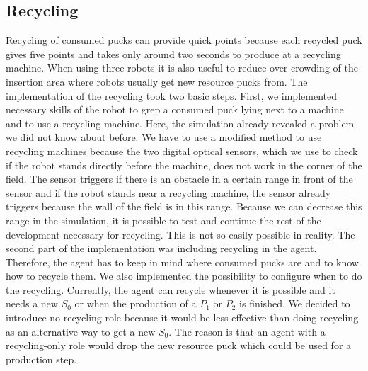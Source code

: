 \subsection{Recycling}
Recycling of consumed pucks can provide quick points because each recycled puck gives five points and takes only around two seconds to produce at a recycling machine. When using three robots it is also useful to reduce over-crowding of the insertion area where robots usually get new resource pucks from. The implementation of the recycling took two basic steps. First, we implemented necessary skills of the robot to grep a consumed puck lying next to a machine and to use a recycling machine. Here, the simulation already revealed a problem we did not know about before. We have to use a modified method to use recycling machines because the two digital optical sensors, which we use to check if the robot stands directly before the machine, does not work in the corner of the field. The sensor triggers if there is an obstacle in a certain range in front of the sensor and if the robot stands near a recycling machine, the sensor already triggers because the wall of the field is in this range. Because we can decrease this range in the simulation, it is possible to test and continue the rest of the development necessary for recycling. This is not so easily possible in reality. The second part of the implementation was including recycling in the agent. Therefore, the agent has to keep in mind where consumed pucks are and to know how to recycle them. We also implemented the possibility to configure when to do the recycling. Currently, the agent can recycle whenever it is possible and it needs a new $S_0$ or when the production of a $P_1$ or $P_2$ is finished. We decided to introduce no recycling role because it would be less effective than doing recycling as an alternative way to get a new $S_0$. The reason is that an agent with a recycling-only role would drop the new resource puck which could be used for a production step.

